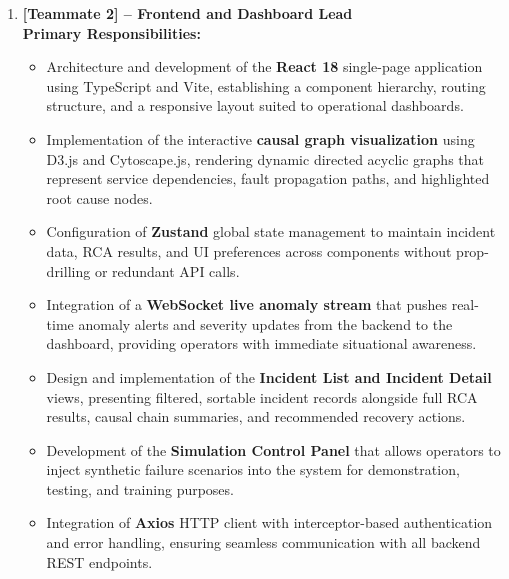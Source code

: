 \begin{enumerate}
    \item \textbf{[Teammate 2] -- Frontend and Dashboard Lead}\\
    \textbf{Primary Responsibilities:}
    \begin{itemize}
        \item Architecture and development of the \textbf{React 18} single-page application using TypeScript and Vite, establishing a component hierarchy, routing structure, and a responsive layout suited to operational dashboards.
        \item Implementation of the interactive \textbf{causal graph visualization} using D3.js and Cytoscape.js, rendering dynamic directed acyclic graphs that represent service dependencies, fault propagation paths, and highlighted root cause nodes.
        \item Configuration of \textbf{Zustand} global state management to maintain incident data, RCA results, and UI preferences across components without prop-drilling or redundant API calls.
        \item Integration of a \textbf{WebSocket live anomaly stream} that pushes real-time anomaly alerts and severity updates from the backend to the dashboard, providing operators with immediate situational awareness.
        \item Design and implementation of the \textbf{Incident List and Incident Detail} views, presenting filtered, sortable incident records alongside full RCA results, causal chain summaries, and recommended recovery actions.
        \item Development of the \textbf{Simulation Control Panel} that allows operators to inject synthetic failure scenarios into the system for demonstration, testing, and training purposes.
        \item Integration of \textbf{Axios} HTTP client with interceptor-based authentication and error handling, ensuring seamless communication with all backend REST endpoints.
    \end{itemize}


\end{enumerate}
